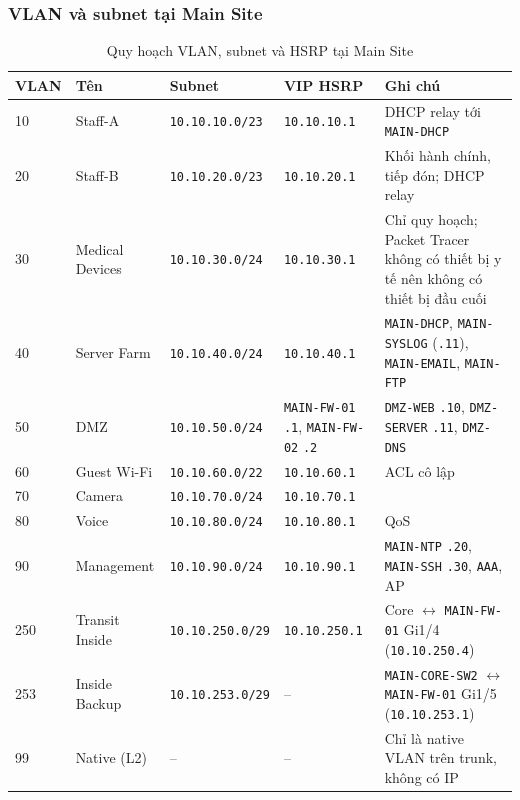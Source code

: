 \subsubsection{VLAN và subnet tại Main Site}
\begin{small}
\setlength{\tabcolsep}{4pt}
\begin{longtable}{|p{1.3cm}|p{2.4cm}|p{2.6cm}|p{3.0cm}|p{4.5cm}|}
\caption{Quy hoạch VLAN, subnet và HSRP tại Main Site} \label{tab:vlan_mainsite} \\
\hline
\textbf{VLAN} & \textbf{Tên} & \textbf{Subnet} & \textbf{VIP HSRP} & \textbf{Ghi chú} \\ \hline
\endhead
10 & Staff-A & \texttt{10.10.10.0/23} & \texttt{10.10.10.1} & DHCP relay tới \texttt{MAIN-DHCP} \\ \hline
20 & Staff-B & \texttt{10.10.20.0/23} & \texttt{10.10.20.1} & Khối hành chính, tiếp đón; DHCP relay \\ \hline
30 & Medical Devices & \texttt{10.10.30.0/24} & \texttt{10.10.30.1} & Chỉ quy hoạch; Packet Tracer không có thiết bị y tế nên không có thiết bị đầu cuối \\ \hline
40 & Server Farm & \texttt{10.10.40.0/24} & \texttt{10.10.40.1} & \texttt{MAIN-DHCP}, \texttt{MAIN-SYSLOG} (\texttt{.11}), \texttt{MAIN-EMAIL}, \texttt{MAIN-FTP} \\ \hline
50 & DMZ & \texttt{10.10.50.0/24} & \texttt{MAIN-FW-01} \texttt{.1}, \texttt{MAIN-FW-02} \texttt{.2} & \texttt{DMZ-WEB} \texttt{.10}, \texttt{DMZ-SERVER} \texttt{.11}, \texttt{DMZ-DNS} \\ \hline
60 & Guest Wi-Fi & \texttt{10.10.60.0/22} & \texttt{10.10.60.1} & ACL cô lập \\ \hline
70 & Camera & \texttt{10.10.70.0/24} & \texttt{10.10.70.1} & \\ \hline
80 & Voice & \texttt{10.10.80.0/24} & \texttt{10.10.80.1} & QoS \\ \hline
90 & Management & \texttt{10.10.90.0/24} & \texttt{10.10.90.1} & \texttt{MAIN-NTP} \texttt{.20}, \texttt{MAIN-SSH} \texttt{.30}, \texttt{AAA}, AP \\ \hline
250 & Transit Inside & \texttt{10.10.250.0/29} & \texttt{10.10.250.1} & Core $\leftrightarrow$ \texttt{MAIN-FW-01} Gi1/4 (\texttt{10.10.250.4}) \\ \hline
253 & Inside Backup & \texttt{10.10.253.0/29} & -- & \texttt{MAIN-CORE-SW2} $\leftrightarrow$ \texttt{MAIN-FW-01} Gi1/5 (\texttt{10.10.253.1}) \\ \hline
99 & Native (L2) & -- & -- & Chỉ là native VLAN trên trunk, không có IP \\ \hline
\end{longtable}
\end{small}

